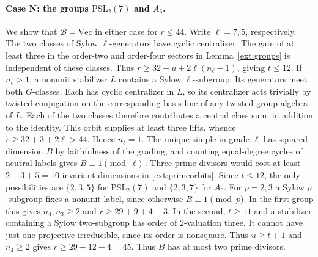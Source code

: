 \documentclass[11pt]{amsart}
\numberwithin{equation}{section}
\theoremstyle{definition}
\theoremstyle{plain}
\begin{document}
\paragraph{Case N: the groups $\mathrm{PSL}_2(7)$ and $A_6$.}\label{ext:neutral-N}
We show that $\mathcal B=\mathrm{Vec}$ in either case for $r\le44$.
Write $\ell=7,5$, respectively. The two classes of Sylow $\ell$-generators
have cyclic centralizer. The gain of at least three in the order-two and
order-four sectors in Lemma~\ref{ext:groups} is independent of these
classes. Thus $r\ge32+u+2\ell(n_\ell-1)$, giving $t\le12$.
If $n_\ell>1$, a nonunit stabilizer $L$ contains a Sylow
$\ell$-subgroup. Its generators meet both $G$-classes. Each
has cyclic centralizer in $L$, so its centralizer acts trivially by
twisted conjugation on the corresponding basis line of any twisted
group algebra of $L$. Each of the two classes therefore contributes
a central class sum, in addition to the identity. This orbit supplies
at least three lifts, whence $r\ge32+3+2\ell>44$.
Hence $n_\ell=1$. The unique simple in grade $\ell$ has squared dimension
$B$ by faithfulness of the grading, and counting equal-degree cycles
of neutral labels gives $B\equiv1\pmod\ell$
\cite[Theorem~2.3(1)]{SchopierayFPF}. Three prime divisors would cost at least
$2+3+5=10$ invariant dimensions in \eqref{ext:primeorbits}. Since
$t\le12$, the only possibilities are $\{2,3,5\}$ for
$\mathrm{PSL}_2(7)$ and $\{2,3,7\}$ for $A_6$.
For $p=2,3$ a Sylow $p$-subgroup fixes a nonunit label, since otherwise
$B\equiv1\pmod p$. In the first group this gives $n_4,n_3\ge2$
and $r\ge29+9+4+3$. In the second,
$t\ge11$ and a stabilizer containing a Sylow two-subgroup has
order of $2$-valuation three. It cannot have just one projective
irreducible, since its order is nonsquare. Thus $u\ge t+1$ and
$n_4\ge2$ gives $r\ge29+12+4=45$. Thus $B$ has at most two prime divisors.
\end{document}
